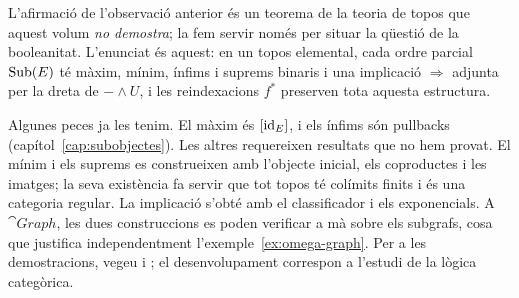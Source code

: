 \begin{nota}\label{nota:sub-heyting}
L'afirmació de l'observació anterior és un teorema de la teoria de topos que aquest volum \emph{no demostra}; la fem servir només per situar la qüestió de la booleanitat. L'enunciat és aquest: en un topos elemental, cada ordre parcial $\operatorname{Sub}(E)$ té màxim, mínim, ínfims i suprems binaris i una implicació $\Rightarrow$ adjunta per la dreta de $-\wedge U$, i les reindexacions $f^{*}$ preserven tota aquesta estructura.

Algunes peces ja les tenim. El màxim és $[\operatorname{id}_E]$, i els ínfims són pullbacks (capítol~\ref{cap:subobjectes}). Les altres requereixen resultats que no hem provat. El mínim i els suprems es construeixen amb l'objecte inicial, els coproductes i les imatges; la seva existència fa servir que tot topos té colímits finits i és una categoria regular. La implicació s'obté amb el classificador i els exponencials. A $\cat{Graph}$, les dues construccions es poden verificar a mà sobre els subgrafs, cosa que justifica independentment l'exemple~\ref{ex:omega-graph}. Per a les demostracions, vegeu \cite[cap.~IV]{maclanemoerdijk} i \cite{johnstone}; el desenvolupament correspon a l'estudi de la lògica categòrica.
\end{nota}

